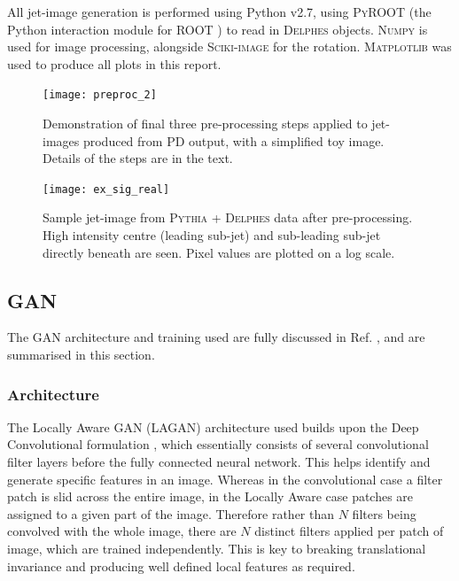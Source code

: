 \documentclass[twocolumn]{article}
\newcommand{\pkg}[1]{\textsc{#1}}
\begin{document}
All jet-image generation is performed using Python v2.7, using \pkg{PyROOT} (the Python interaction module for \pkg{ROOT} \cite{root}) to read in \pkg{Delphes} objects. \pkg{Numpy} \cite{numpy} is used for image processing, alongside \pkg{Sciki-image} \cite{skimage} for the rotation. \pkg{Matplotlib} \cite{matplotlib} was used to produce all plots in this report.

\begin{figure}[!htbp]
	\centering
	\texttt{[image: preproc\_2]}
%	
	
	\caption{Demonstration of final three pre-processing steps applied to jet-images produced from PD output, with a simplified toy image. Details of the steps are in the text.}
	\label{fig:preproc}
	
\end{figure}

\begin{figure}[H]
	\centering
	\texttt{[image: ex\_sig\_real]}
	
	\caption{Sample jet-image from \pkg{Pythia} + \pkg{Delphes} data after pre-processing. High intensity centre (leading sub-jet) and sub-leading sub-jet directly beneath are seen. Pixel values are plotted on a log scale.}
	\label{fig:ex_sig_real}
	
\end{figure}

\subsection{GAN}
The GAN architecture and training used are fully discussed in Ref. \cite{de2017learning}, and are summarised in this section.
 
\subsubsection{Architecture}
The Locally Aware GAN (LAGAN) architecture used builds upon the Deep Convolutional formulation \cite{Radford2015}, which essentially consists of several convolutional filter layers before the fully connected neural network. This helps identify and generate specific features in an image. Whereas in the convolutional case a filter patch is slid across the entire image, in the Locally Aware case patches are assigned to a given part of the image. Therefore rather than $N$ filters being convolved with the whole image, there are $N$ distinct filters applied per patch of image, which are trained independently. This is key to breaking translational invariance and producing well defined local features as required.
\end{document}
